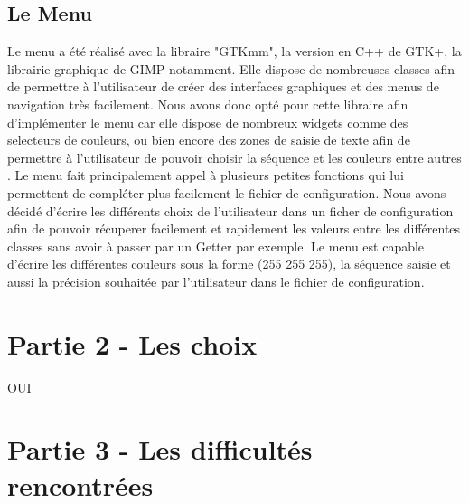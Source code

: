 \documentclass{article}
\begin{document}
\subsection*{Le Menu}
Le menu a été réalisé avec la libraire "GTKmm", la version en C++ de GTK+, la librairie graphique de GIMP notamment. Elle dispose de nombreuses classes afin de permettre à l'utilisateur de créer des interfaces graphiques et des menus de navigation très facilement. Nous avons donc opté pour cette libraire afin d'implémenter le menu car elle dispose de nombreux widgets comme des selecteurs de couleurs, ou bien encore des zones de saisie de texte afin de permettre à l'utilisateur de pouvoir choisir la séquence et les couleurs entre autres . Le menu fait principalement appel à plusieurs petites fonctions qui lui permettent de compléter plus facilement le fichier de configuration. Nous avons décidé d'écrire les différents choix de l'utilisateur dans un ficher de configuration afin de pouvoir récuperer facilement et rapidement les valeurs entre les différentes classes sans avoir à passer par un Getter par exemple. Le menu est capable d'écrire les différentes couleurs sous la forme (255 255 255), la séquence saisie et aussi la précision souhaitée par l'utilisateur dans le fichier de configuration. 

\section* {Partie 2 - Les choix}
OUI

\section* {Partie 3 - Les difficultés rencontrées}
\end{document}
